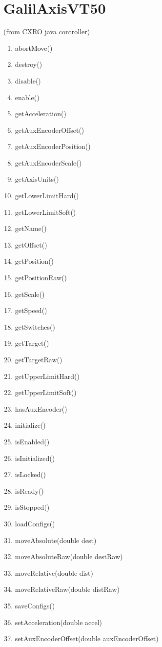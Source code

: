 \documentclass[10pt,letter,twoside]{report}
\begin{document}
\section{GalilAxisVT50}
(from CXRO java controller)
\begin{enumerate}
\item abortMove() 
\item destroy() 
\item disable() 
\item enable() 
\item getAcceleration() 
\item getAuxEncoderOffset() 
\item getAuxEncoderPosition() 
\item getAuxEncoderScale() 
\item getAxisUnits() 
\item getLowerLimitHard() 
\item getLowerLimitSoft() 
\item getName() 
\item getOffset() 
\item getPosition() 
\item getPositionRaw() 
\item getScale() 
\item getSpeed() 
\item getSwitches() 
\item getTarget() 
\item getTargetRaw() 
\item getUpperLimitHard() 
\item getUpperLimitSoft() 
\item hasAuxEncoder() 
\item initialize() 
\item isEnabled() 
\item isInitialized() 
\item isLocked() 
\item isReady() 
\item isStopped() 
\item loadConfigs() 
\item moveAbsolute(double dest) 
\item moveAbsoluteRaw(double destRaw) 
\item moveRelative(double dist) 
\item moveRelativeRaw(double distRaw) 
\item saveConfigs() 
\item setAcceleration(double accel) 
\item setAuxEncoderOffset(double auxEncoderOffset) 

\end{enumerate}
\end{document}
